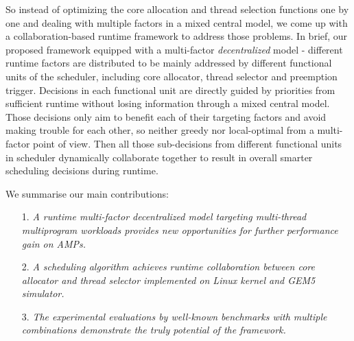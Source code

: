 \documentclass[sigplan,review,anonymous]{acmart}\settopmatter{printfolios=true,printccs=false,printacmref=false}
\begin{document}

So instead of optimizing the core allocation and thread selection functions one by one and dealing with multiple factors in a mixed central model, we come up with a collaboration-based runtime framework to address those problems. In brief, our proposed framework equipped with a multi-factor {\it decentralized} model - different runtime factors are distributed to be mainly addressed by different functional units of the scheduler, including core allocator, thread selector and preemption trigger. Decisions in each functional unit are directly guided by priorities from sufficient runtime without losing information through a mixed central model. Those decisions only aim to benefit each of their targeting factors and avoid making trouble for each other, so neither greedy nor local-optimal from a multi-factor point of view. Then all those sub-decisions from different functional units in scheduler dynamically collaborate together to result in overall smarter scheduling decisions during runtime. 

We summarise our main contributions:
\begin{itemize}
\item[1.] {\it A runtime multi-factor decentralized model targeting multi-thread multiprogram workloads provides new opportunities for further performance gain on AMPs.} 
\item[2.] {\it A scheduling algorithm achieves runtime collaboration between core allocator and thread selector implemented on Linux kernel and GEM5 simulator.}
\item[3.] {\it The experimental evaluations by well-known benchmarks with multiple combinations demonstrate the truly potential of the framework.}
\end{itemize}
\end{document}
